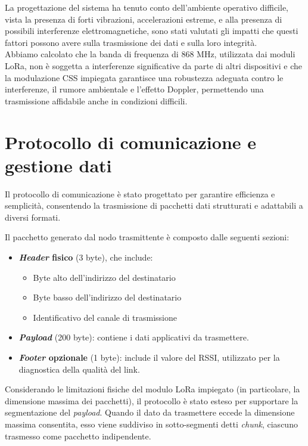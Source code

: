 \documentclass[12pt,a4paper,twoside]{book}
\begin{document}
La progettazione del sistema ha tenuto conto dell'ambiente
operativo difficile, vista la presenza di forti vibrazioni, accelerazioni estreme,
e alla presenza di possibili interferenze elettromagnetiche, sono stati valutati
gli impatti che questi fattori possono avere sulla trasmissione dei dati e sulla
loro integrità. \\
Abbiamo calcolato che la banda di frequenza di 868 MHz, utilizzata dai moduli
\ac{LoRa}, non è soggetta a interferenze significative da parte di altri dispositivi
e che la modulazione \ac{CSS} impiegata garantisce una robustezza adeguata contro
le interferenze, il rumore ambientale e l'effetto Doppler, permettendo una
trasmissione affidabile anche in condizioni difficili.

\section{Protocollo di comunicazione e gestione dati}

Il protocollo di comunicazione è stato progettato per garantire efficienza e
semplicità, consentendo la trasmissione di pacchetti dati strutturati e adattabili
a diversi formati.

Il pacchetto generato dal nodo trasmittente è composto dalle seguenti sezioni:

\begin{itemize}
    \item \textbf{\emph{Header} fisico} (3 byte), che include:
          \begin{itemize}
              \item Byte alto dell’indirizzo del destinatario
              \item Byte basso dell’indirizzo del destinatario
              \item Identificativo del canale di trasmissione
          \end{itemize}
    \item \textbf{\emph{Payload}} (200 byte): contiene i dati applicativi da trasmettere.

    \item \textbf{\emph{Footer} opzionale} (1 byte): include il valore del \ac{RSSI},
          utilizzato per la diagnostica della qualità del link.
\end{itemize}

Considerando le limitazioni fisiche del modulo \ac{LoRa} impiegato (in particolare,
la dimensione massima dei pacchetti), il protocollo è stato esteso per supportare
la segmentazione del \emph{payload}. Quando il dato da trasmettere eccede la dimensione
massima consentita, esso viene suddiviso in sotto-segmenti detti \emph{chunk},
ciascuno trasmesso come pacchetto indipendente.
\end{document}
